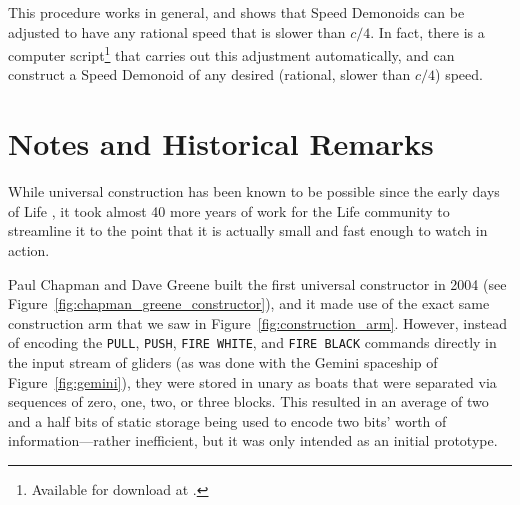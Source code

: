 This procedure works in general, and shows that Speed Demonoids can be adjusted to have any rational speed that is slower than $c/4$. In fact, there is a computer script\footnote{Available for download at .} that carries out this adjustment automatically, and can construct a Speed Demonoid of any desired (rational, slower than $c/4$) speed.


\section{Notes and Historical Remarks}\label{sec:universal_construction_history}

While universal construction has been known to be possible since the early days of Life \cite{Wain74,BCG82,Pou85}, it took almost 40 more years of work for the Life community to streamline it to the point that it is actually small and fast enough to watch in action.

Paul Chapman and Dave Greene built the first universal constructor in 2004 (see Figure~\ref{fig:chapman_greene_constructor}), and it made use of the exact same construction arm that we saw in Figure~\ref{fig:construction_arm}. However, instead of encoding the \texttt{PULL}, \texttt{PUSH}, \texttt{FIRE WHITE}, and \texttt{FIRE BLACK} commands directly in the input stream of gliders (as was done with the Gemini spaceship of Figure~\ref{fig:gemini}), they were stored in unary as boats that were separated via sequences of zero, one, two, or three blocks. This resulted in an average of two and a half bits of static storage being used to encode two bits' worth of information---rather inefficient, but it was only intended as an initial prototype.

